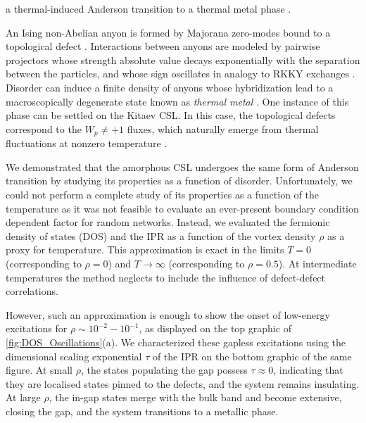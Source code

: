 a thermal-induced Anderson transition to a thermal metal phase \autocite{selfThermallyInducedMetallic2019}.

An Ising non-Abelian anyon is formed by Majorana zero-modes bound to a topological defect \autocite{Beenakker2013}. Interactions between anyons are modeled by pairwise projectors whose strength absolute value decays exponentially with the separation between the particles, and whose sign oscillates in analogy to RKKY exchanges \autocite{Laumann2012,Lahtinen_2011,lahtinenTopologicalLiquidNucleation2012}. Disorder can induce a finite density of anyons whose hybridization lead to a macroscopically degenerate state known as \emph{thermal metal} \autocite{Laumann2012}. One instance of this phase can be settled on the Kitaev CSL. In this case, the topological defects correspond to the \(W_p \neq +1\) fluxes, which naturally emerge from thermal fluctuations at nonzero temperature \autocite{selfThermallyInducedMetallic2019}.

We demonstrated that the amorphous CSL undergoes the same form of Anderson transition by studying its properties as a function of disorder. Unfortunately, we could not perform a complete study of its properties as a function of the temperature as it was not feasible to evaluate an ever-present boundary condition dependent factor \autocite{pedrocchiPhysicalSolutionsKitaev2011,Zschocke_Physical_states2015} for random networks. Instead, we evaluated the fermionic density of states (DOS) and the IPR as a function of the vortex density \(\rho\) as a proxy for temperature. This approximation is exact in the limits \(T = 0\) (corresponding to \(\rho = 0\)) and \(T \to \infty\) (corresponding to \(\rho = 0.5\)). At intermediate temperatures the method neglects to include the influence of defect-defect correlations.

However, such an approximation is enough to show the onset of low-energy excitations for \(\rho \sim 10^{-2}-10^{-1}\), as displayed on the top graphic of \protect\hyperlink{fig:DOS_Oscillations}{{[}fig:DOS\_Oscillations{]}}(a). We characterized these gapless excitations using the dimensional scaling exponential \(\tau\) of the IPR on the bottom graphic of the same figure. At small \(\rho\), the states populating the gap possess \(\tau\approx0\), indicating that they are localised states pinned to the defects, and the system remains insulating. At large \(\rho\), the in-gap states merge with the bulk band and become extensive, closing the gap, and the system transitions to a metallic phase.

